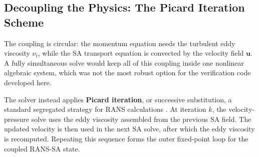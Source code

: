 \subsection{Decoupling the Physics: The Picard Iteration Scheme}
The coupling is circular: the momentum equation needs the turbulent eddy viscosity $\nu_t$, while the SA transport equation is convected by the velocity field $\mathbf{u}$. A fully simultaneous solve would keep all of this coupling inside one nonlinear algebraic system, which was not the most robust option for the verification code developed here.

The solver instead applies \textbf{Picard iteration}, or successive substitution, a standard segregated strategy for RANS calculations \cite{Ferziger2012,Versteeg2007}. At iteration $k$, the velocity-pressure solve uses the eddy viscosity assembled from the previous SA field. The updated velocity is then used in the next SA solve, after which the eddy viscosity is recomputed. Repeating this sequence forms the outer fixed-point loop for the coupled RANS-SA state.

